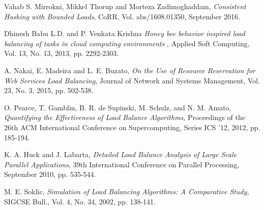 \begin{thebibliography}{1}
Vahab S. Mirrokni, Mikkel Thorup and Morteza Zadimoghaddam,
  \emph{Consistent Hashing with Bounded Loads},
  CoRR,
  Vol. abs/1608.01350, September 2016.

  Dhinesh Babu L.D. and P. Venkata Krishna
  \emph{Honey bee behavior inspired load balancing of tasks in cloud computing environments },
  Applied Soft Computing,
  Vol. 13, No. 13, 2013, pp. 2292-2303.

  A. Nakai, E. Madeira and L. E. Buzato,
  \emph{On the Use of Resource Reservation for Web Services Load Balancing},
  Journal of Network and Systems Management,
  Vol. 23, No. 3, 2015, pp. 502-538.

  O. Pearce, T. Gamblin, B. R. de Supinski, M. Schulz, and N. M. Amato,
  \emph{Quantifying the Effectiveness of Load Balance Algorithms},
  Proceedings of the 26th ACM International Conference on Supercomputing,
  Series ICS '12, 2012, pp. 185-194.

  K. A. Huck and J. Labarta,
  \emph{Detailed Load Balance Analysis of Large Scale Parallel Applications},
  39th International Conference on Parallel Processing,
  September 2010, pp. 535-544.

  M. E. Soklic,
  \emph{Simulation of Load Balancing Algorithms: A Comparative Study},
  SIGCSE Bull.,
  Vol. 4, No. 34, 2002, pp. 138-141.

\end{thebibliography}

